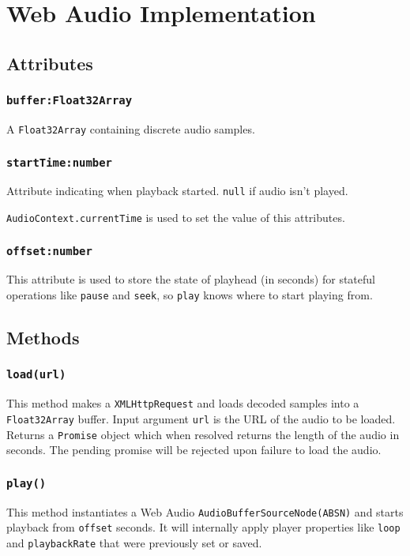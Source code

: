\documentclass[20pt]{article}
\begin{document}
\section*{Web Audio Implementation}

\subsection*{Attributes}
\subsubsection*{\texttt{buffer:Float32Array}} 
A \texttt{Float32Array} containing discrete audio samples.

\subsubsection*{\texttt{startTime:number}}
Attribute indicating when playback started. \texttt{null} if audio isn't played. 

\texttt{AudioContext.currentTime} is used to set the value of this attributes.

\subsubsection*{\texttt{offset:number}}
This attribute is used to store the state of playhead (in seconds) for stateful operations like \texttt{pause} and \texttt{seek}, so \texttt{play} knows where to start playing from.

\subsection*{Methods}
\subsubsection*{\texttt{load(url)}}
This method makes a \texttt{XMLHttpRequest} and loads decoded samples into a \texttt{Float32Array} buffer. Input argument \texttt{url} is the URL of the audio to be loaded. Returns a \texttt{Promise} object which when resolved returns the length of the audio in seconds. The pending promise will be rejected upon failure to load the audio.

\subsubsection*{\texttt{play()}}
This method instantiates a Web Audio \texttt{AudioBufferSourceNode(ABSN)} and starts playback from \texttt{offset} seconds. It will internally apply player properties like \texttt{loop} and \texttt{playbackRate} that were previously set or saved.
\end{document}
